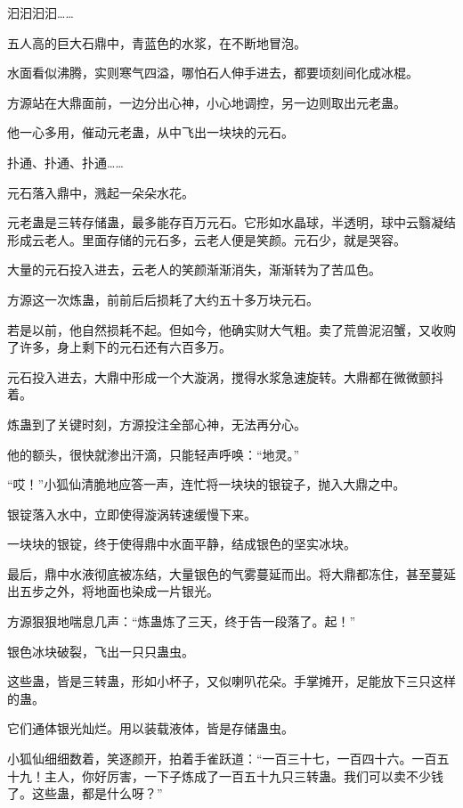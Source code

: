 
\begin{this_body}

汩汩汩汩……

五人高的巨大石鼎中，青蓝色的水浆，在不断地冒泡。

水面看似沸腾，实则寒气四溢，哪怕石人伸手进去，都要顷刻间化成冰棍。

方源站在大鼎面前，一边分出心神，小心地调控，另一边则取出元老蛊。

他一心多用，催动元老蛊，从中飞出一块块的元石。

扑通、扑通、扑通……

元石落入鼎中，溅起一朵朵水花。

元老蛊是三转存储蛊，最多能存百万元石。它形如水晶球，半透明，球中云翳凝结形成云老人。里面存储的元石多，云老人便是笑颜。元石少，就是哭容。

大量的元石投入进去，云老人的笑颜渐渐消失，渐渐转为了苦瓜色。

方源这一次炼蛊，前前后后损耗了大约五十多万块元石。

若是以前，他自然损耗不起。但如今，他确实财大气粗。卖了荒兽泥沼蟹，又收购了许多，身上剩下的元石还有六百多万。

元石投入进去，大鼎中形成一个大漩涡，搅得水浆急速旋转。大鼎都在微微颤抖着。

炼蛊到了关键时刻，方源投注全部心神，无法再分心。

他的额头，很快就渗出汗滴，只能轻声呼唤：“地灵。”

“哎！”小狐仙清脆地应答一声，连忙将一块块的银锭子，抛入大鼎之中。

银锭落入水中，立即使得漩涡转速缓慢下来。

一块块的银锭，终于使得鼎中水面平静，结成银色的坚实冰块。

最后，鼎中水液彻底被冻结，大量银色的气雾蔓延而出。将大鼎都冻住，甚至蔓延出五步之外，将地面也染成一片银光。

方源狠狠地喘息几声：“炼蛊炼了三天，终于告一段落了。起！”

银色冰块破裂，飞出一只只蛊虫。

这些蛊，皆是三转蛊，形如小杯子，又似喇叭花朵。手掌摊开，足能放下三只这样的蛊。

它们通体银光灿烂。用以装载液体，皆是存储蛊虫。

小狐仙细细数着，笑逐颜开，拍着手雀跃道：“一百三十七，一百四十六。一百五十九！主人，你好厉害，一下子炼成了一百五十九只三转蛊。我们可以卖不少钱了。这些蛊，都是什么呀？”


\end{this_body}
